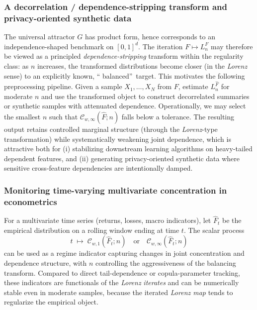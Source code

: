 \documentclass[onecolumn]{article}
\begin{document}
\subsubsection{A decorrelation / dependence-stripping transform and
privacy-oriented synthetic data}

The universal attractor $G$ has product form, hence corresponds to an
independence-shaped benchmark on $[0,1]^{d}$. The iteration $F\mapsto
L_{n}^{F}$ may therefore be viewed as a principled \textit{%
dependence-stripping} transform within the regularity class: as $n$
increases, the transformed distributions become closer (in the \textit{Lorenz%
} sense) to an explicitly known, \textquotedblleft
balanced\textquotedblright\ target. This motivates the following
preprocessing pipeline. Given a sample $X_{1},\dots ,X_{N}$ from $F$,
estimate $L_{n}^{\widehat{F}}$ for moderate $n$ and use the transformed
object to construct decorrelated summaries or synthetic samples with
attenuated dependence. Operationally, we may select the smallest $n$ such
that $\mathcal{C}_{w,\infty }(\widehat{F};n)$ falls below a tolerance. The
resulting output retains controlled marginal structure (through the \textit{%
Lorenz}-type transformation) while systematically weakening joint
dependence, which is attractive both for (i) stabilizing downstream learning
algorithms on heavy-tailed dependent features, and (ii) generating
privacy-oriented synthetic data where sensitive cross-feature dependencies
are intentionally damped.

\subsubsection{Monitoring time-varying multivariate concentration in
econometrics}

For a multivariate time series (returns, losses, macro indicators), let $%
\widehat{F}_{t}$ be the empirical distribution on a rolling window ending at
time $t$. The scalar process 
\begin{equation}
t\;\longmapsto \;\mathcal{C}_{w,1}(\widehat{F}_{t};n)\quad \text{or}\quad 
\mathcal{C}_{w,\infty }(\widehat{F}_{t};n)  \label{2081}
\end{equation}%
can be used as a regime indicator capturing changes in joint concentration
and dependence structure, with $n$ controlling the aggressiveness of the
balancing transform. Compared to direct tail-dependence or copula-parameter
tracking, these indicators are functionals of the \textit{Lorenz} \textit{%
iterates} and can be numerically stable even in moderate samples, because
the iterated \textit{Lorenz map} tends to regularize the empirical object.
\end{document}
